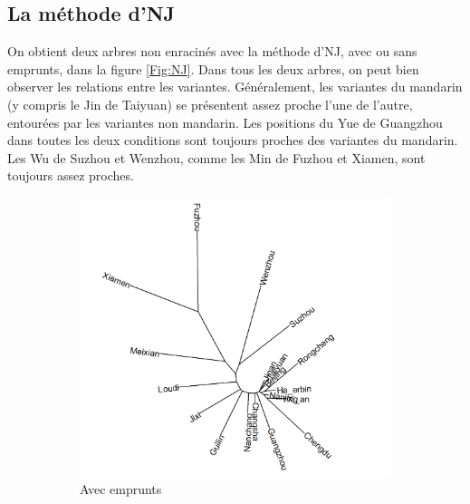 \documentclass{scrbook}
\newcounter{c}[subsubsection]
\begin{document}
\begin{sloppypar}
\subsection{La méthode d'NJ}
On obtient deux arbres non enracinés avec la méthode d'NJ, avec ou sans emprunts, dans la figure \ref{Fig:NJ}. Dans tous les deux arbres, on peut bien observer les relations entre les variantes. Généralement, les variantes du mandarin (y compris le Jin de Taiyuan) se présentent assez proche l'une de l'autre, entourées par les variantes non mandarin. Les positions du Yue de Guangzhou dans toutes les deux conditions sont toujours proches des variantes du mandarin. Les Wu de Suzhou et Wenzhou, comme les Min de Fuzhou et Xiamen, sont toujours assez proches.

\begin{figure}[htbp]
\flushleft
\begin{subfigure}{.5\textwidth}
\centering
\includegraphics[scale=.25]{Figure/NJ_with}
\caption{Avec emprunts}
\end{subfigure}
\begin{subfigure}{.5\textwidth}
\centering

\end{subfigure}
\end{figure}
\end{sloppypar}
\end{document}
